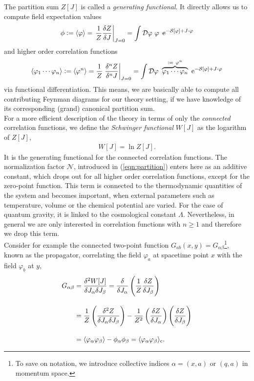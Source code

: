 The partition sum $Z[J]$ is called a \textit{generating functional}. It directly allows us to compute field expectation values
\begin{align}
	\phi := \cf{\varphi} = \eval{\frac{1}{Z}\frac{\delta Z}{\delta J}}_{J=0} = \int \D\varphi \ \varphi \ \operatorname{e}^{-\S + J\cdot\varphi}
\end{align}
and higher order correlation functions
\begin{align}
\cf{\varphi_1 \cdots \varphi_n} := \cf{\varphi^n} = \frac{1}{Z}\eval{\frac{\delta^n Z}{\delta^n J}}_{J=0} = \int \D\varphi \ \overbrace{\varphi_1 \cdots \varphi_n}^{:= \ \varphi^n} \ \operatorname{e}^{-\S + J\cdot\varphi}
\end{align}
via functional differentiation. This means, we are basically able to compute all contributing Feynman diagrams for our theory setting, if we have knowledge of its corresponding (grand) canonical partition sum. \\
 For a more efficient description of the theory in terms of only the \textit{connected} correlation functions, we define the \textit{Schwinger functional} $W[J]$ as the logarithm of $Z[J]$,  
\begin{align}
W[J] = \ln Z[J].
\label{eqn:Schwinger}
\end{align}
It is the generating functional for the connected correlation functions. The normalization factor $\mathcal{N}$, introduced in (\ref{eqn:partition}) enters here as an additive constant, which drops out for all higher order correlation functions, except for the zero-point function. This term is connected to the thermodynamic quantities of the system and becomes important, when external parameters such as temperature, volume or the chemical potential are varied. For the case of quantum gravity, it is linked to the cosmological constant $\Lambda$. Nevertheless, in general we are only interested in correlation functions with $n\geq 1$ and therefore we drop this term.\\
Consider for example the connected two-point function $G_{ab}(x,y) = G_{\alpha\beta}$\footnote{To save on notation, we introduce collective indices $\alpha = (x,a)$ or $(q,a)$ in momentum space.}, known as the propagator, correlating the field $\varphi_a$ at spacetime point $x$ with the field $\varphi_b$ at $y$,
\begin{equation}
\begin{aligned}
	G_{\alpha\beta} &= \frac{\delta^2W[J]}{\delta J_{\alpha}\delta J_{\beta}} = \frac{\delta}{\delta J_{\alpha}}\left(\frac{1}{Z}\frac{\delta Z}{\delta J_{\beta}}\right)  \\[10pt]
				&= \frac{1}{Z}\left(\frac{\delta^2Z}{\delta J_{\alpha}\delta J_{\beta}}\right) - \frac{1}{Z^2}\left(\frac{\delta Z}{\delta J_{\alpha}}\right)\left(\frac{\delta Z}{\delta J_{\beta}}\right)\\[10pt]
				&= \langle \varphi_{\alpha}\varphi_{\beta} \rangle - \phi_{\alpha}\phi_{\beta} = \langle \varphi_{\alpha}\varphi_{\beta} \rangle_{\text{c}}. 
\end{aligned}
\label{eqn:G_connected}						
\end{equation}
